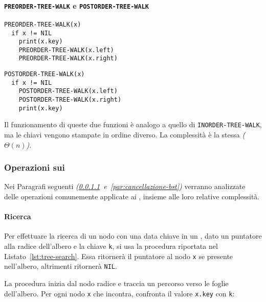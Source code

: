 \documentclass[italian, 10pt]{article}
\begin{document}
\paragraph{\texttt{PREORDER-TREE-WALK} e \texttt{POSTORDER-TREE-WALK}}

\begin{minipage}[t]{0.495\textwidth}
  \begin{lstlisting}[style=pseudocode, caption={Attraversamento anticipato di \BST}, label={lst:attraversamento-bst-preorder}]
PREORDER-TREE-WALK(x)
  if x != NIL
    print(x.key)
    PREORDER-TREE-WALK(x.left)
    PREORDER-TREE-WALK(x.right)
  \end{lstlisting}
\end{minipage}
\begin{minipage}[t]{0.495\textwidth}
  \begin{lstlisting}[style=pseudocode, caption={Attraversamento posticipato di un \BST}, label={lst:attraversamento-bst-postorder}]
POSTORDER-TREE-WALK(x)
  if x != NIL
    POSTORDER-TREE-WALK(x.left)
    POSTORDER-TREE-WALK(x.right)
    print(x.key)
    \end{lstlisting}
\end{minipage}

Il funzionamento di queste due funzioni è analogo a quello di \texttt{INORDER-TREE-WALK}, ma le chiavi vengono stampate in ordine diverso.
La complessità è la stessa \textit{(\(\Theta(n)\))}.

\subsubsection{Operazioni sui \BST}
\label{sec:operazioni-bst}

Nei Paragrafi seguenti \textit{(\ref{par:ricerca-bst}~e~\ref{par:cancellazione-bst})} verranno analizzate delle operazioni comunemente applicate ai \BST, insieme alle loro relative complessità.

\paragraph{Ricerca}
\label{par:ricerca-bst}

Per effettuare la ricerca di un nodo con una data chiave in un \BST, dato un puntatore alla radice dell'albero e la chiave \texttt{k}, si usa la procedura riportata nel Listato~\ref{lst:tree-search}.
Essa ritornerà il puntatore al nodo \texttt{x} se presente nell'albero, altrimenti ritornerà \texttt{NIL}.

La procedura inizia dal nodo radice e traccia un percorso verso le foglie dell'albero.
Per ogni nodo \texttt{x} che incontra, confronta il valore \texttt{x.key} con \texttt{k}:
\end{document}
